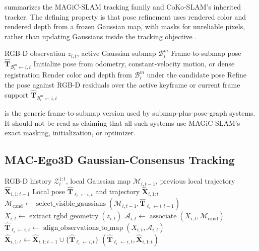 \documentclass[11pt, a4paper, logo]{googledeepmind}
\begin{document}
 summarizes the MAGiC-SLAM tracking family and CoKo-SLAM's inherited tracker. The defining property is that pose refinement uses rendered color and rendered depth from a frozen Gaussian map, with masks for unreliable pixels, rather than updating Gaussians inside the tracking objective \citep{yugay2025magic_slam,li2026coko_slam}.

\begin{algorithm}[H]
\caption{RGB-D submap tracking}
\label{alg:app-rgbd-submap-tracking}
\small
\begin{algorithmic}[1]
  \Require RGB-D observation $z_{i,t}$, active Gaussian submap $\mathcal{B}_{i}^{m}$
  \Ensure Frame-to-submap pose $\hat{\mathbf{T}}_{\mathcal{B}_i^m\leftarrow i,t}$
  \State Initialize pose from odometry, constant-velocity motion, or dense registration
  \State Render color and depth from $\mathcal{B}_{i}^{m}$ under the candidate pose
  \State Refine the pose against RGB-D residuals over the active keyframe or current frame support
  \State \Return $\hat{\mathbf{T}}_{\mathcal{B}_i^m\leftarrow i,t}$
\end{algorithmic}
\end{algorithm}

 is the generic frame-to-submap version used by submap-plus-pose-graph systems. It should not be read as claiming that all such systems use MAGiC-SLAM's exact masking, initialization, or optimizer.

\subsection{MAC-Ego3D Gaussian-Consensus Tracking}

\begin{algorithm}[H]
\caption{MAC-Ego3D Gaussian-consensus tracking}
\label{alg:app-mac-consensus-tracking}
\small
\begin{algorithmic}[1]
  \Require RGB-D history $\mathcal{Z}_i^{1:t}$, local Gaussian map $\mathcal{M}_{i,t-1}$, previous local trajectory $\hat{\mathbf{X}}_{i,1:t-1}$
  \Ensure Local pose $\hat{\mathbf{T}}_{\ell_i\leftarrow i,t}$ and trajectory $\hat{\mathbf{X}}_{i,1:t}$
  \State $\mathcal{M}_{\mathrm{cand}} \gets \operatorname{select\_visible\_gaussians}(\mathcal{M}_{i,t-1},\hat{\mathbf{T}}_{\ell_i\leftarrow i,t-1})$
  \State $X_{i,t} \gets \operatorname{extract\_rgbd\_geometry}(z_{i,t})$
  \State $\mathcal{A}_{i,t} \gets \operatorname{associate}(X_{i,t},\mathcal{M}_{\mathrm{cand}})$
  \State $\hat{\mathbf{T}}_{\ell_i\leftarrow i,t}\gets\operatorname{align\_observations\_to\_map}(X_{i,t},\mathcal{A}_{i,t})$
  \State $\hat{\mathbf{X}}_{i,1:t}\gets\hat{\mathbf{X}}_{i,1:t-1}\cup\{\hat{\mathbf{T}}_{\ell_i\leftarrow i,t}\}$
  \State \Return $(\hat{\mathbf{T}}_{\ell_i\leftarrow i,t},\hat{\mathbf{X}}_{i,1:t})$
\end{algorithmic}
\end{algorithm}
\end{document}
